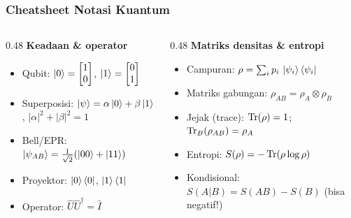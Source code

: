 \begin{frame}
    \frametitle{Cheatsheet Notasi Kuantum}
    \begin{columns}[T]
        \begin{column}{0.48\textwidth}
            {\small\textbf{Keadaan \& operator}}
            {\tiny
            \begin{itemize}\justifying
                \item[$\Rightarrow$] Qubit:
                      $\ket{0}=\begin{bmatrix}1\\0\end{bmatrix}$,
                      $\ket{1}=\begin{bmatrix}0\\1\end{bmatrix}$
                \item[$\Rightarrow$] Superposisi:
                      $\ket{\psi}=\alpha\ket{0}+\beta\ket{1}$,
                      $|\alpha|^2+|\beta|^2=1$
                \item[$\Rightarrow$] Bell/EPR:
                      $\ket{\psi_{AB}}=\tfrac{1}{\sqrt{2}}(\ket{00}+\ket{11})$
                \item[$\Rightarrow$] Proyektor: $\ket{0}\bra{0}$,
                      $\ket{1}\bra{1}$
                \item[$\Rightarrow$] Operator: $\hat{U}\hat{U}^\dagger=\hat{I}$
            \end{itemize}}
        \end{column}
        \begin{column}{0.48\textwidth}
            {\small\textbf{Matriks densitas \& entropi}}
            {\tiny
            \begin{itemize}\justifying
                \item[$\Rightarrow$] Campuran:
                      $\rho=\sum_i p_i\,\ket{\psi_i}\bra{\psi_i}$
                \item[$\Rightarrow$] Matriks gabungan:
                      $\rho_{AB}=\rho_A\otimes\rho_B$
                \item[$\Rightarrow$] Jejak (trace):
                      $\operatorname{Tr}(\rho)=1$;
                      $\operatorname{Tr}_B(\rho_{AB})=\rho_A$
                \item[$\Rightarrow$] Entropi:
                      $S(\rho)=-\operatorname{Tr}(\rho\log\rho)$
                \item[$\Rightarrow$] Kondisional:
                      $S(A|B)=S(AB)-S(B)$ (bisa negatif!)
            \end{itemize}}
        \end{column}
    \end{columns}
\end{frame}

